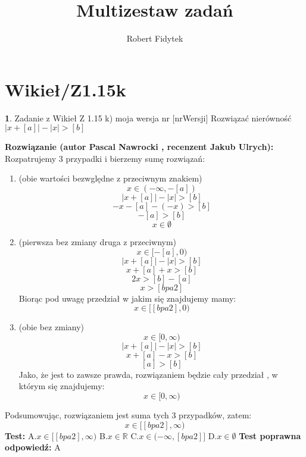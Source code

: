 \documentclass[12pt, a4paper]{article}
\title{Multizestaw zadań}
\author{Robert Fidytek}
\date{}
\theoremstyle{definition} %
\newtheorem{zad}{}
\newcommand{\kategoria}[1]{\section{#1}} %
\newcommand{\zadStart}[1]{\begin{zad}#1\newline} %
\newcommand{\zadStop}{\end{zad}}   %
\newcommand{\rozwStart}[2]{\noindent \textbf{Rozwiązanie (autor #1 , recenzent #2): }\newline} %
\newcommand{\odpStop}{\newline}                                             %
\newcommand{\testStart}{\noindent \textbf{Test:}\newline} %
\newcommand{\testStop}{\newline} %
\newcommand{\kluczStart}{\noindent \textbf{Test poprawna odpowiedź:}\newline} %
\newcommand{\kluczStop}{\newline} %
\begin{document}
\maketitle



\kategoria{Wikieł/Z1.15k}
\zadStart{Zadanie z Wikieł Z 1.15 k) moja wersja nr [nrWersji]}
Rozwiązać nierówność $|x+[a]|-|x|>[b]$
\zadStop
\rozwStart{Pascal Nawrocki}{Jakub Ulrych}
Rozpatrujemy 3 przypadki i bierzemy sumę rozwiązań:
\begin{enumerate}
\item (obie wartości bezwględne z przeciwnym znakiem) $$x\in(-\infty,-[a])$$ 
$$|x+[a]|-|x|>[b]$$
$$-x-[a]-(-x)>[b]$$
$$-[a]>[b]$$
$$x\in\emptyset$$
\item (pierwsza bez zmiany druga z przeciwnym)$$x\in[-[a],0)$$ 
$$|x+[a]|-|x|>[b]$$
$$x+[a]+x>[b]$$
$$2x>[b]-[a]$$
$$x>[bpa2]$$
Biorąc pod uwagę przedział w jakim się znajdujemy mamy:
$$x\in[[bpa2],0)$$
\item (obie bez zmiany) $$x\in[0,\infty)$$ 
$$|x+[a]|-|x|>[b]$$
$$x+[a]-x>[b]$$
$$[a]>[b]$$
Jako, że jest to zawsze prawda, rozwiązaniem będzie cały przedział , w którym się znajdujemy:
$$x\in[0,\infty)$$
\end{enumerate}
Podsumowując, rozwiązaniem jest suma tych 3 przypadków, zatem:
$$x\in[[bpa2],\infty)$$
\odpStop
\testStart
A.$x\in[[bpa2],\infty)$
B.$x\in\mathbb{R}$
C.$x\in(-\infty,[bpa2]]$
D.$x\in\emptyset$
\testStop
\kluczStart
A
\kluczStop
\end{document}
